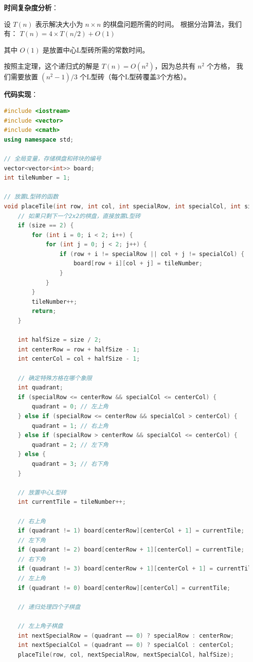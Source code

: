 \documentclass[12pt,twoside]{article}
\begin{document}
\begin{problems}
\textbf{时间复杂度分析}：

设 $T(n)$ 表示解决大小为 $n \times n$ 的棋盘问题所需的时间。
根据分治算法，我们有：
$T(n) = 4 \times T(n/2) + O(1)$

其中 $O(1)$ 是放置中心L型砖所需的常数时间。

按照主定理，这个递归式的解是 $T(n) = O(n^2)$，因为总共有 $n^2$ 个方格，
我们需要放置 $(n^2-1)/3$ 个L型砖（每个L型砖覆盖3个方格）。

\textbf{代码实现}：

\begin{lstlisting}[language=C++]
#include <iostream>
#include <vector>
#include <cmath>
using namespace std;

// 全局变量，存储棋盘和砖块的编号
vector<vector<int>> board;
int tileNumber = 1;

// 放置L型砖的函数
void placeTile(int row, int col, int specialRow, int specialCol, int size) {
    // 如果只剩下一个2x2的棋盘，直接放置L型砖
    if (size == 2) {
        for (int i = 0; i < 2; i++) {
            for (int j = 0; j < 2; j++) {
                if (row + i != specialRow || col + j != specialCol) {
                    board[row + i][col + j] = tileNumber;
                }
            }
        }
        tileNumber++;
        return;
    }
    
    int halfSize = size / 2;
    int centerRow = row + halfSize - 1;
    int centerCol = col + halfSize - 1;
    
    // 确定特殊方格在哪个象限
    int quadrant;
    if (specialRow <= centerRow && specialCol <= centerCol) {
        quadrant = 0; // 左上角
    } else if (specialRow <= centerRow && specialCol > centerCol) {
        quadrant = 1; // 右上角
    } else if (specialRow > centerRow && specialCol <= centerCol) {
        quadrant = 2; // 左下角
    } else {
        quadrant = 3; // 右下角
    }
    
    // 放置中心L型砖
    int currentTile = tileNumber++;
    
    // 右上角
    if (quadrant != 1) board[centerRow][centerCol + 1] = currentTile;
    // 左下角
    if (quadrant != 2) board[centerRow + 1][centerCol] = currentTile;
    // 右下角
    if (quadrant != 3) board[centerRow + 1][centerCol + 1] = currentTile;
    // 左上角
    if (quadrant != 0) board[centerRow][centerCol] = currentTile;
    
    // 递归处理四个子棋盘
    
    // 左上角子棋盘
    int nextSpecialRow = (quadrant == 0) ? specialRow : centerRow;
    int nextSpecialCol = (quadrant == 0) ? specialCol : centerCol;
    placeTile(row, col, nextSpecialRow, nextSpecialCol, halfSize);
    

\end{lstlisting}
\end{problems}
\end{document}
